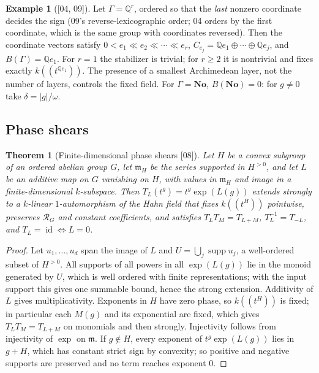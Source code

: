 \documentclass[11pt,oneside]{article}
\numberwithin{equation}{section}
\newtheorem{theorem}{Theorem}[section]
\theoremstyle{definition}
\newtheorem{example}[example]{Example}
\theoremstyle{remark}
\newcommand{\No}{\mathbf{No}}
\newcommand{\Q}{\mathbb Q}
\newcommand{\mm}{\mathfrak m}
\newcommand{\supp}{\operatorname{supp}}
\newcommand{\id}{\operatorname{id}}
\newcommand{\bb}{\mathbin{\ll}}
\newcommand{\Hahn}[2]{#1((t^{#2}))}
\newcommand{\src}[1]{\textup{\textsf{\small[#1]}}}
\begin{document}
\begin{example}[\src{04, 09}]\label{opa:ex:Qr}
Let $\Gamma=\Q^r$, ordered so that the \emph{last} nonzero coordinate decides the
sign (09's reverse-lexicographic order; 04 orders by the first coordinate, which
is the same group with coordinates reversed). Then the coordinate vectors satisfy
$0<e_1\bb e_2\bb\cdots\bb e_r$, $C_{e_j}=\Q e_1\oplus\cdots\oplus\Q e_j$, and
$B(\Gamma)=\Q e_1$. For $r=1$ the stabilizer is trivial; for $r\ge2$ it is
nontrivial and fixes exactly $\Hahn k{\Q e_1}$. The presence of a smallest
Archimedean layer, not the number of layers, controls the fixed field. For
$\Gamma=\No$, $B(\No)=0$: for $g\ne0$ take $\delta=|g|/\omega$.
\end{example}

\subsection{Phase shears}

\begin{theorem}[Finite-dimensional phase shears \src{08}]\label{opa:thm:phase}
Let $H$ be a convex subgroup of an ordered abelian group $G$, let $\mm_H$ be the
series supported in $H^{>0}$, and let $L$ be an additive map on $G$ vanishing on
$H$, with values in $\mm_H$ and image in a finite-dimensional $k$-subspace. Then
$T_L(t^g)=t^g\exp(L(g))$ extends strongly to a $k$-linear $1$-automorphism of
the Hahn field that fixes $\Hahn kH$ pointwise, preserves $\mathcal R_G$ and
constant coefficients, and satisfies $T_LT_M=T_{L+M}$, $T_L^{-1}=T_{-L}$,
and $T_L=\id\Leftrightarrow L=0$.
\end{theorem}
\begin{proof}
Let $u_1,\dots,u_d$ span the image of $L$ and $U=\bigcup_j\supp u_j$, a
well-ordered subset of $H^{>0}$. All supports of all powers in all $\exp(L(g))$
lie in the monoid generated by $U$, which is well ordered with finite
representations; with the input support this gives one summable bound, hence
the strong extension. Additivity of $L$ gives multiplicativity. Exponents in
$H$ have zero phase, so $\Hahn kH$ is fixed; in particular each $M(g)$ and its
exponential are fixed, which gives $T_LT_M=T_{L+M}$ on monomials and then
strongly. Injectivity follows from injectivity of $\exp$ on $\mm$. If $g\notin
H$, every exponent of $t^g\exp(L(g))$ lies in $g+H$, which has constant strict
sign by convexity; so positive and negative supports are preserved and no term
reaches exponent $0$.
\end{proof}
\end{document}
